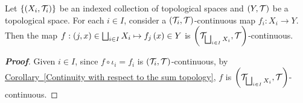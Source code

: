 \begin{proposition}
  Let $\left\{\left(X_i,\mathcal{T}_i\right)\right\}$ be an indexed collection of topological spaces and $\left(Y,\mathcal{T}\right)$ be a topological space. For each $i\in I$, consider a $\left(\mathcal{T}_i,\mathcal{T}\right)$-continuous map $f_i:X_i\rightarrow Y$. Then the map $f:\left(j,x\right)\in\bigsqcup_{i\in I}{X_i}\mapsto f_j\left(x\right)\in Y$ is $\left(\mathcal{T}_{\bigsqcup_{i\in I}{X_i}},\mathcal{T}\right)$-continuous.

  \begin{proof}[\rm\textbf{Proof}]
    Given $i\in I$, since $f\circ\iota_i=f_i$ is $\left(\mathcal{T}_i,\mathcal{T}\right)$-continuous, by \hyperref[Continuity with respect to the sum topology]{Corollary~\ref*{Continuity with respect to the sum topology}}, $f$ is  $\left(\mathcal{T}_{\bigsqcup_{i\in I}{X_i}},\mathcal{T}\right)$-continuous.
  \end{proof}
\end{proposition}